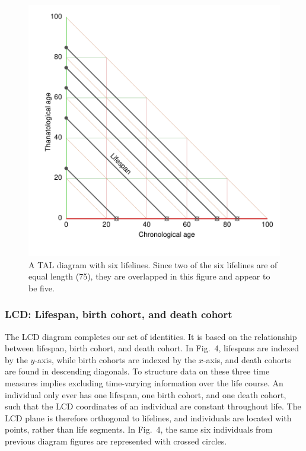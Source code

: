 \documentclass{bmcart}
\theoremstyle{definition}
\begin{document}
\begin{figure}[h!] 
\caption{A TAL diagram with six lifelines. Since two of the six lifelines are
 of equal length (75), they are overlapped in this figure and appear to be five.}
\label{fig:TAL}
\centering
\includegraphics[scale=0.7]{Fig3.pdf}
\end{figure} 

\FloatBarrier
\subsubsection{LCD: Lifespan, birth cohort, and death cohort}
\label{sec:lcd}
\FloatBarrier

The LCD diagram completes our set of identities. It is based on the relationship
between lifespan, birth cohort, and death cohort. In
Fig.~4, lifespans are indexed by the $y$-axis, while birth cohorts are indexed by the $x$-axis, and death cohorts
are found in descending diagonals. To structure data on these three
time measures implies excluding time-varying information over the life course.
An individual
only ever has one lifespan, one birth cohort, and one death cohort, such that
the LCD coordinates of an individual are constant throughout life.
The LCD plane is therefore orthogonal to lifelines, and individuals are located
with points, rather than life segments.
In Fig.~4, the same six individuals from previous diagram figures are represented with crossed circles.
\end{document}
